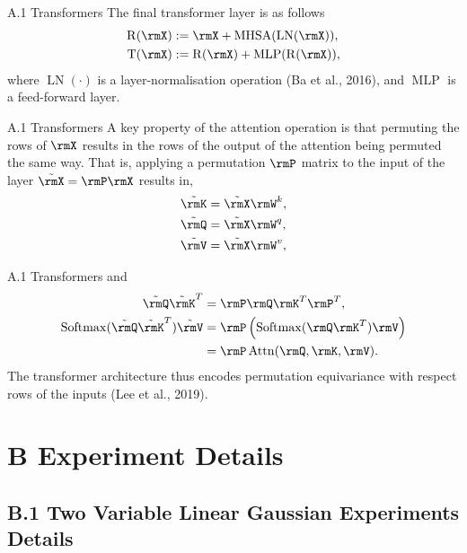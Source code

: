 \documentclass[aspectratio=169,10pt]{beamer}
\begin{document}
\begin{frame}{A.1 Transformers}
The final transformer layer is as follows
\begin{align*}
    \operatorname{R}(\rmX) &:= \rmX + \operatorname{MHSA}( \operatorname{LN}(\rmX) ), \\
    \operatorname{T}(\rmX) &:= \operatorname{R}(\rmX) + \operatorname{MLP}(\operatorname{R}(\rmX)),
\end{align*}
where $\operatorname{LN}(\cdot)$ is a layer-normalisation operation (Ba et al., 2016), and $\operatorname{MLP}$ is a feed-forward layer.
\end{frame}

\begin{frame}{A.1 Transformers}
\small
A key property of the attention operation is that permuting the rows of $\rmX$ results in the rows of the output of the attention being permuted the same way. That is, applying a permutation $\rmP$ matrix to the input of the layer $\tilde{\rmX} = \rmP \rmX$ results in,
\begin{align*}
    \tilde{\rmK} &= \tilde{\rmX}\rmW^k, \\
    \tilde{\rmQ} &= \tilde{\rmX}\rmW^q, \\
    \tilde{\rmV} &= \tilde{\rmX}\rmW^v,
\end{align*}
\end{frame}

\begin{frame}{A.1 Transformers}
and
\begin{align*}
    \tilde{\rmQ}\tilde{\rmK}^T &= \rmP \rmQ \rmK ^T\rmP^T, \\
    \operatorname{Softmax}(\tilde{\rmQ}\tilde{\rmK}^T) \tilde{\rmV} &= \rmP \left( \operatorname{Softmax}(\rmQ \rmK^T ) \rmV \right) \\
    &= \rmP \operatorname{Attn}(\rmQ, \rmK, \rmV).
\end{align*}
The transformer architecture thus encodes permutation equivariance with respect rows of the inputs (Lee et al., 2019).
\end{frame}

\section{B Experiment Details}
\subsection{B.1 Two Variable Linear Gaussian Experiments Details}
\end{document}

